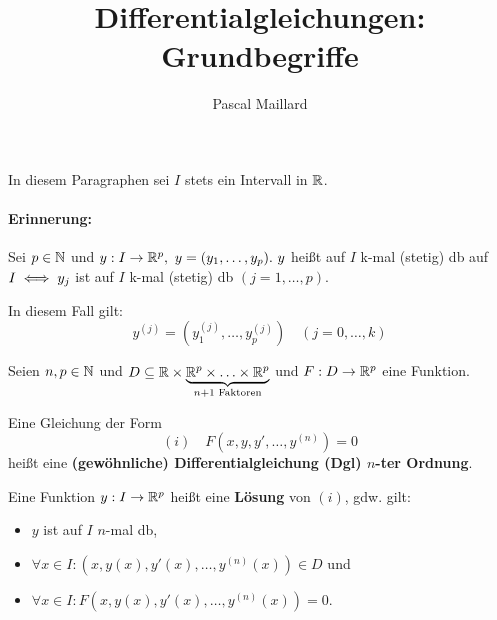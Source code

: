 \documentclass{article}
\title{Differentialgleichungen: Grundbegriffe}
\author{Pascal Maillard}
\begin{document}
\maketitle

In diesem Paragraphen sei $I$ stets ein Intervall in $\mathbb{R}$.

\paragraph{Erinnerung:}
Sei $p\in\mathbb{N}$ und $y:I\to \mathbb{R}^p,\ y=(y_1,\ldots,y_p).\ y$ heißt auf $I$ k-mal (stetig) db auf $I \iff y_j$ ist auf $I$ k-mal (stetig) db $(j=1,\ldots,p).$

In diesem Fall gilt: $$y^{(j)} = (y_1^{(j)},\ldots,y_p^{(j)})\quad(j=0,\ldots,k)$$

\begin{definition}
Seien $n,p\in\mathbb{N}$ und $D\subseteq\mathbb{R}\times\underbrace{\mathbb{R}^p\times\ldots\times\mathbb{R}^p}_{n+1\text{ Faktoren}}$ und $F:D\to\mathbb{R}^p$ eine Funktion.

Eine Gleichung der Form $$(i)\quad F(x,y,y',\ldots,y^{(n)})=0$$ heißt eine \textbf{(gewöhnliche) Differentialgleichung (Dgl) $n$-ter Ordnung}.


Eine Funktion $y:I\to\mathbb{R}^p$ heißt eine \textbf{Lösung} von $(i)$, gdw. gilt:
\begin{itemize}
\item $y$ ist auf $I$ $n$-mal db,
\item $\forall x\in I: (x,y(x),y'(x),\ldots,y^{(n)}(x))\in D$ und
\item $\forall x\in I: F(x,y(x),y'(x),\ldots,y^{(n)}(x)) = 0.$
\end{itemize}
\end{definition}
\end{document}
